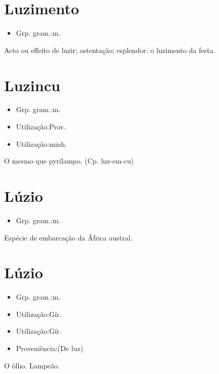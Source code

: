 \section{Luzimento}
\begin{itemize}
\item {Grp. gram.:m.}
\end{itemize}
Acto ou effeito de luzir; ostentação; esplendor: \textunderscore o luzimento da festa\textunderscore .
\section{Luzincu}
\begin{itemize}
\item {Grp. gram.:m.}
\end{itemize}
\begin{itemize}
\item {Utilização:Prov.}
\end{itemize}
\begin{itemize}
\item {Utilização:minh.}
\end{itemize}
O mesmo que \textunderscore pyrilampo\textunderscore .
(Cp. \textunderscore luz-em-cu\textunderscore )
\section{Lúzio}
\begin{itemize}
\item {Grp. gram.:m.}
\end{itemize}
Espécie de embarcação da África austral.
\section{Lúzio}
\begin{itemize}
\item {Grp. gram.:m.}
\end{itemize}
\begin{itemize}
\item {Utilização:Gír.}
\end{itemize}
\begin{itemize}
\item {Utilização:Gír.}
\end{itemize}
\begin{itemize}
\item {Proveniência:(De \textunderscore luz\textunderscore )}
\end{itemize}
O ôlho.
Lampeão.
